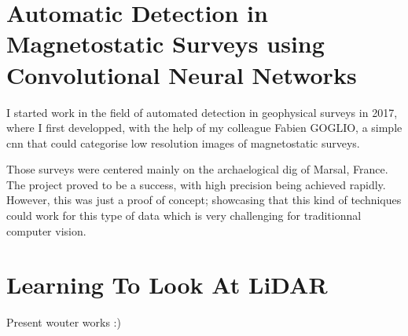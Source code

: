 \section{Automatic Detection in Magnetostatic Surveys using Convolutional Neural Networks}
I started work in the field of automated detection in geophysical surveys in 2017, where I first developped, with the help of my colleague Fabien GOGLIO, a simple \gls{cnn} that could categorise low resolution images of magnetostatic surveys. 

Those surveys were centered mainly on the archaelogical dig of Marsal, France. The project proved to be a success, with high precision being achieved rapidly. However, this was just a proof of concept; showcasing that this kind of techniques could work for this type of data which is very challenging for traditionnal computer vision. 

\section{Learning To Look At LiDAR}
Present wouter works :)
